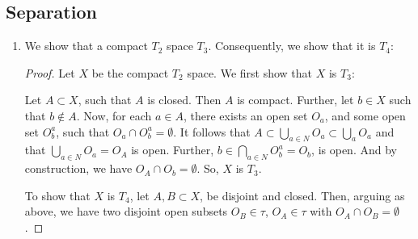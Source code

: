 \documentclass{book}
\begin{document}
\subsection{Separation}
\begin{enumerate}[(1)]

    \item We show that a compact $T_2$ space $T_3$. Consequently, we show that it is $T_4$: 
        \begin{proof} Let $X$ be the compact $T_2$ space. We first show that $X$ is $T_3$: 
            \par Let $A \subset X$, such that $A$ is closed. Then $A$ is compact. Further, let $b \in X$ such that $b \notin A$. Now, for each $a \in A$, there exists an open set $O_a$, and some open set $O_b^a$, such that $O_a \cap O_b^a = \emptyset$. It follows that $A \subset \bigcup_{a \in N} O_a \subset \bigcup_a O_a$ and that $\bigcup_{a \in N} O_a = O_A$ is open. Further, $b \in \bigcap_{a \in N} O_b^a = O_b$, is open. And by construction, we have $O_A \cap O_b = \emptyset$. So, $X$ is $T_3$. 
            \par To show that $X$ is $T_4$, let $A, B \subset X$, be disjoint and closed. Then, arguing as above, we have two disjoint open subsets $O_B \in \tau$, $O_A \in \tau$ with $O_A \cap O_B = \emptyset$. 
        \end{proof}

\end{enumerate}
\end{document}
